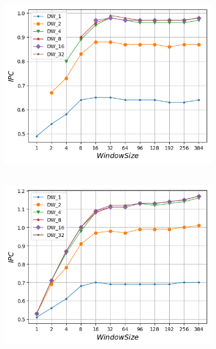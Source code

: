    \begin{minipage}{\textwidth}
      \begin{center}
         \\
         \vspace{3mm}
         \includegraphics[width=0.7\textwidth, frame]{./graphs/ipc/gobmk.png}
         \vspace{6mm}
      \end{center}
   \end{minipage}

   \begin{minipage}{\textwidth}
      \begin{center}
         \\
         \vspace{3mm}
         \includegraphics[width=0.7\textwidth, frame]{./graphs/ipc/sjeng.png}
         \vspace{6mm}
      \end{center}
   \end{minipage}

